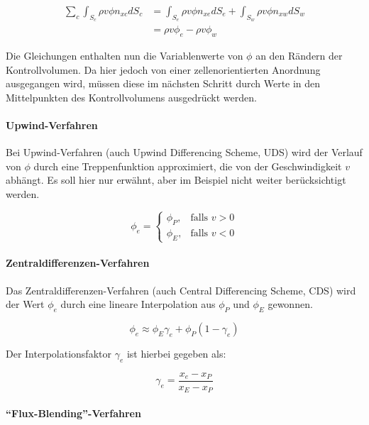 \documentclass[11pt, ngerman,colorback,accentcolor=tud2d]{tudreport}
\begin{document}
\begin{align}
  \sum_c \int_{S_c} \rho v \phi n_{xc} dS_c &=
  \int_{S_e} \rho v \phi n_{xe} dS_e +\nonumber
  \int_{S_w} \rho v \phi n_{xw} dS_w\\
  &= \rho v \phi_e - \rho v \phi_w \label{eq:surface_east_west}
\end{align}

Die Gleichungen enthalten nun die Variablenwerte von $\phi$ an den Rändern der
Kontrollvolumen. Da hier jedoch von einer zellenorientierten Anordnung ausgegangen
wird, müssen diese im nächsten Schritt durch Werte in den Mittelpunkten des
Kontrollvolumens ausgedrückt werden.

\paragraph{Upwind-Verfahren}
Bei Upwind-Verfahren (auch Upwind Differencing Scheme, UDS) wird der Verlauf von $\phi$ durch eine Treppenfunktion approximiert, die
von der Geschwindigkeit $v$ abhängt. Es soll hier nur erwähnt, aber im Beispiel
nicht weiter berücksichtigt werden.

\begin{equation*}
\phi_e=\left\{\begin{array}{cl} \phi_P, & \mbox{falls }v>0\\
\phi_E, & \mbox{falls } v<0\end{array}\right.
\end{equation*}

\paragraph{Zentraldifferenzen-Verfahren}
Das Zentraldifferenzen-Verfahren (auch Central Differencing Scheme, CDS) wird der
Wert $\phi_e$ durch eine lineare Interpolation aus $\phi_P$ und $\phi_E$ gewonnen.

\begin{equation*}
  \phi_e \approx \phi_E\gamma_e + \phi_P (1-\gamma_e)
\end{equation*}

Der Interpolationsfaktor $\gamma_e$ ist hierbei gegeben als:

\begin{equation}
  \gamma_e = \frac{x_e-x_P}{x_E-x_P}
  \label{eq:cds_faktor}
\end{equation}

\paragraph{``Flux-Blending''-Verfahren}
\end{document}
